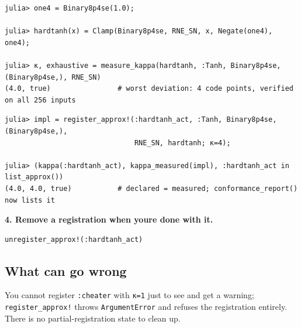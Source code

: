 \nopagebreak[4]
\begin{minipage}{\linewidth}
\begin{verbatim}
julia> one4 = Binary8p4se(1.0);

julia> hardtanh(x) = Clamp(Binary8p4se, RNE_SN, x, Negate(one4), one4);

julia> κ, exhaustive = measure_kappa(hardtanh, :Tanh, Binary8p4se, (Binary8p4se,), RNE_SN)
(4.0, true)                # worst deviation: 4 code points, verified on all 256 inputs
\end{verbatim}




\begin{verbatim}
julia> impl = register_approx!(:hardtanh_act, :Tanh, Binary8p4se, (Binary8p4se,),
                               RNE_SN, hardtanh; κ=4);

julia> (kappa(:hardtanh_act), kappa_measured(impl), :hardtanh_act in list_approx())
(4.0, 4.0, true)           # declared = measured; conformance_report() now lists it
\end{verbatim}
\end{minipage}




\textbf{4. Remove a registration when you{\textquotesingle}re done with it.}




\begin{verbatim}
unregister_approx!(:hardtanh_act)
\end{verbatim}



\subsection{What can go wrong}



\label{7385351218440078181-dup7}{}


\begin{tcolorbox}[toptitle=-1mm,bottomtitle=1mm,colback=admonition-warning!50!white,colframe=admonition-warning,title=\textbf{Understating κ is not silently clamped — it throws}]
You cannot register \texttt{:cheater} with \texttt{κ=1} {\textquotedbl}just to see{\textquotedbl} and get a warning; \texttt{register\_\allowbreak{}approx!} throws \texttt{ArgumentError} and refuses the registration entirely. There is no partial-registration state to clean up.

\end{tcolorbox}


